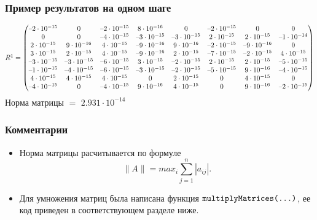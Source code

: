 \documentclass[a4paper,11pt]{article}
\begin{document}
\subsubsection{Пример результатов на одном шаге}

  \small
  \[R \footnotemark = \begin{pmatrix}
    \text{--}2 \cdot 10^{-15} & 0 & \text{--}2 \cdot 10^{-15} & 8 \cdot 10^{-16} &
          0 & \text{--}2 \cdot 10^{-15} & 0 & 0 \\
    0 & 0 & \text{--}4 \cdot 10^{-15} & \text{--}3 \cdot 10^{-15} & \text{--}3 \cdot 10^{-15} &
          2 \cdot 10^{-15} & 2 \cdot 10^{-15} & \text{--}1 \cdot 10^{-14} \\
    2 \cdot 10^{-15} & 9 \cdot 10^{-16} & 4 \cdot 10^{-15} & \text{--}9 \cdot 10^{-16} &
          9 \cdot 10^{-16} & \text{--}2 \cdot 10^{-15} & \text{--}9 \cdot 10^{-16} & 0 \\
    3 \cdot 10^{-15} & 2 \cdot 10^{-15} & 4 \cdot 10^{-15} & \text{--}9 \cdot 10^{-16} &
          2 \cdot 10^{-15} & \text{--}7 \cdot 10^{-15} & \text{--}2 \cdot 10^{-15} & 4 \cdot 10^{-15} \\
    \text{--}3 \cdot 10^{-15} & \text{--}3 \cdot 10^{-15} & \text{--}6 \cdot 10^{-15} & 3 \cdot 10^{-15} &
          \text{--}2 \cdot 10^{-15} & 2 \cdot 10^{-15} & 2 \cdot 10^{-15} & \text{--}5 \cdot 10^{-15} \\
    \text{--}1 \cdot 10^{-15} & \text{--}4 \cdot 10^{-15} & \text{--}6 \cdot 10^{-15} & \text{--}3 \cdot 10^{-15} &
          \text{--}2 \cdot 10^{-15} & \text{--}5 \cdot 10^{-15} & 9 \cdot 10^{-16} & \text{--}4 \cdot 10^{-15} \\
    4 \cdot 10^{-15} & 4 \cdot 10^{-15} & 4 \cdot 10^{-15} & 0 & 2 \cdot 10^{-15} & 0 & 4 \cdot 10^{-15} & 0 \\
    \text{--}4 \cdot 10^{-15} & 0 & \text{--}4 \cdot 10^{-15} & 9 \cdot 10^{-16} &
          4 \cdot 10^{-15} & 0 & 9 \cdot 10^{-16} & \text{--}2 \cdot 10^{-15} \\
  \end{pmatrix} \]
\normalsize
Норма матрицы $=$ $2.931 \cdot 10^{-14}$
\subsubsection{Комментарии}
\begin{itemize}
  \item Норма матрицы расчитывается по формуле \[\parallel A \parallel = max_i \sum_{j=1}^n |a_{ij}|.\]
  \item Для умножения матриц была написана функция $\verb|multiplyMatrices(...)|$, ее код приведен в соответствующем разделе ниже.
\end{itemize}
\end{document}
